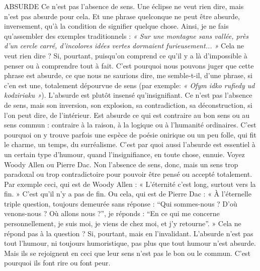 ABSURDE Ce n’est pas l’absence de sens. Une éclipse ne veut rien dire, mais
n'est pas absurde pour cela. Et une phrase quelconque ne peut
être absurde, inversement, qu’à la condition de signifier quelque chose.
Ainsi, je ne fais qu’assembler des exemples traditionnels : {\it « Sur une montagne
sans vallée, près d’un cercle carré, d'incolores idées vertes dormaient
furieusement... »} Cela ne veut rien dire ? Si, pourtant, puisqu'on comprend
ce qu'il y a là d’impossible à penser ou à comprendre tout à fait. C’est pourquoi
nous pouvons juger que cette phrase est absurde, ce que nous ne saurions
dire, me semble-t-il, d’une phrase, si c’en est une, totalement
dépourvue de sens (par exemple: {\it « Ofym idko rufiedy ud kodziriaku »}).
L’absurde est plutôt insensé qu’insignifiant. Ce n’est pas l’absence de sens,
mais son inversion, son explosion, sa contradiction, sa déconstruction, si
l’on peut dire, de l’intérieur. Est absurde ce qui est contraire au bon sens ou
au sens commun : contraire à la raison, à la logique ou à l'humanité ordinaires.
C’est pourquoi on y trouve parfois une espèce de poésie onirique ou
un peu folle, qui fit le charme, un temps, du surréalisme. C’est par quoi
aussi l'absurde est essentiel à un certain type d’humour, quand l’insignifiance,
en toute chose, ennuie. Voyez Woody Allen ou Pierre Dac. Non
l’absence de sens, donc, mais un sens trop paradoxal ou trop contradictoire
pour pouvoir être pensé ou accepté totalement. Par exemple ceci, qui est de
Woody Allen : « L’éternité c’est long, surtout vers la fin. » C’est qu’il n’y a
pas de fin. Ou cela, qui est de Pierre Dac : « À l’éternelle triple question,
toujours demeurée sans réponse : “Qui sommes-nous ? D'où venons-nous ?
Où allons nous ?”, je réponds : “En ce qui me concerne personnellement, je
suis moi, je viens de chez moi, et j'y retourne”. » Cela ne répond pas à la
question ? Si, pourtant, mais en l'invalidant. L’absurde n’est pas tout
l'humour, ni toujours humoristique, pas plus que tout humour n'est
absurde. Mais ils se rejoignent en ceci que leur sens n’est pas le bon ou le
commun. C’est pourquoi ils font rire ou font peur.

